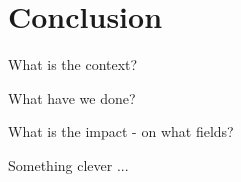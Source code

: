 \ifx\master\undefined\fi


\chapter{Conclusion}
\label{ch:conclusion}

What is the context?

What have we done?

What is the impact - on what fields?

Something clever ...






\ifx\master\undefined\fi
